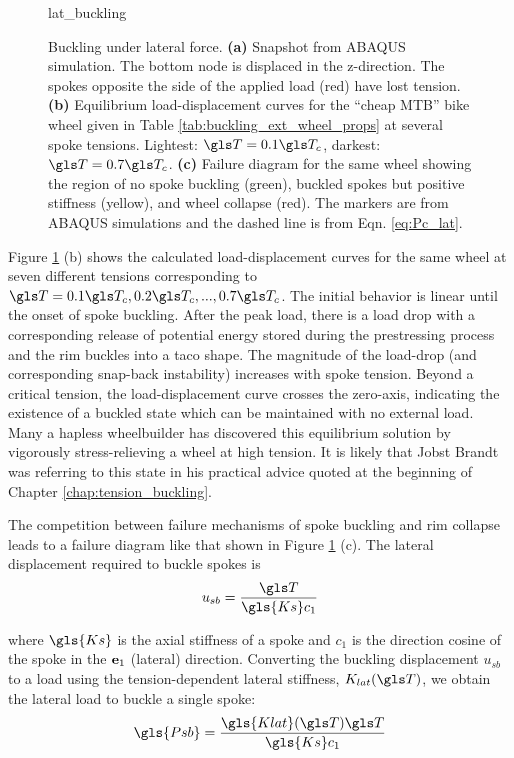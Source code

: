 \documentclass[\rootdir/thesis.tex]{subfiles}
\begin{document}
\begin{figure}
\centering
{lat_buckling} 
\caption{Buckling under lateral force. \textbf{(a)} Snapshot from ABAQUS simulation. The bottom node is displaced in the z-direction. The spokes opposite the side of the applied load (red) have lost tension. \textbf{(b)} Equilibrium load-displacement curves for the ``cheap MTB'' bike wheel given in Table \ref{tab:buckling_ext_wheel_props} at several spoke tensions. Lightest: $\T=0.1\T_c$, darkest: $\T=0.7\T_c$. \textbf{(c)} Failure diagram for the same wheel showing the region of no spoke buckling (green), buckled spokes but positive stiffness (yellow), and wheel collapse (red). The markers are from ABAQUS simulations and the dashed line is from Eqn. \eqref{eq:Pc_lat}.}
\label{fig:lat_buckling}
\end{figure}

Figure \ref{fig:lat_buckling} (b) shows the calculated load-displacement curves for the same wheel at seven different tensions corresponding to $\T=0.1\T_c, 0.2\T_c,...,0.7\T_c$. The initial behavior is linear until the onset of spoke buckling. After the peak load, there is a load drop with a corresponding release of potential energy stored during the prestressing process and the rim buckles into a taco shape. The magnitude of the load-drop (and corresponding snap-back instability) increases with spoke tension. Beyond a critical tension, the load-displacement curve crosses the zero-axis, indicating the existence of a buckled state which can be maintained with no external load. Many a hapless wheelbuilder has discovered this equilibrium solution by vigorously stress-relieving a wheel at high tension. It is likely that Jobst Brandt was referring to this state in his practical advice quoted at the beginning of Chapter \ref{chap:tension_buckling}.

The competition between failure mechanisms of spoke buckling and rim collapse leads to a failure diagram like that shown in Figure \ref{fig:lat_buckling} (c). The lateral displacement required to buckle spokes is
\begin{equation}
u_{sb} = \frac{\T}{\gls{Ks} c_1}
\end{equation}

where $\gls{Ks}$ is the axial stiffness of a spoke and $c_1$ is the direction cosine of the spoke in the $\mathbf{e}_1$ (lateral) direction. Converting the buckling displacement $u_{sb}$ to a load using the tension-dependent lateral stiffness, $K_{lat}(\T)$, we obtain the lateral load to buckle a single spoke:
\begin{equation}
\label{eq:Pc_lat}
\gls{Psb} = \frac{\gls{Klat}(\T) \T}{\gls{Ks} c_1}
\end{equation}
\end{document}
